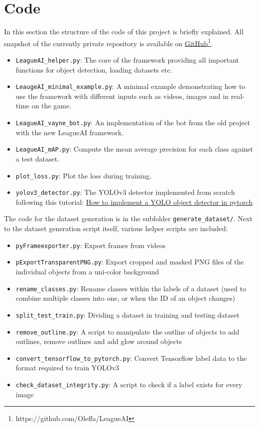 \section{Code}
In this section the structure of the code of this project is briefly explained.
All snapshot of the currently private repository is available on \href{https://github.com/Oleffa/LeagueAI}{GitHub}\footnote{https://github.com/Oleffa/LeagueAI}.
\begin{itemize}
\item \texttt{LeagueAI\_helper.py}: The core of the framework providing all important functions for object detection, loading datasets etc.
\item \texttt{LeaugeAI\_minimal\_example.py}: A minimal example demonstrating how to use the framework with different inputs such as videos, images and in real-time on the game.
\item \texttt{LeagueAI\_vayne\_bot.py}: An implementation of the bot from the old project with the new LeagueAI framework.
\item \texttt{LeagueAI\_mAP.py}: Compute the mean average precision for each class against a test dataset.
\item \texttt{plot\_loss.py}: Plot the loss during training.
\item \texttt{yolov3\_detector.py}: The YOLOv3 detector implemented from scratch following this tutorial: \href{https://blog.paperspace.com/how-to-implement-a-yolo-object-detector-in-pytorch}{How to implement a YOLO object detector in pytorch}
\end{itemize}
The code for the dataset generation is in the subfolder \texttt{generate\_dataset/}.
Next to the dataset generation script itself, various helper scripts are included:
\begin{itemize}
\item \texttt{pyFrameexporter.py}: Export frames from videos
\item \texttt{pExportTransparentPNG.py}: Export cropped and masked PNG files of the individual objects from a uni-color background
\item \texttt{rename\_classes.py}: Rename classes within the labels of a dataset (used to combine multiple classes into one, or when the ID of an object changes)
\item \texttt{split\_test\_train.py}: Dividing a dataset in training and testing dataset
\item \texttt{remove\_outline.py}: A script to manipulate the outline of objects to add outlines, remove outlines and add glow around objects
\item \texttt{convert\_tensorflow\_to\_pytorch.py}: Convert Tensorflow label data to the format required to train YOLOv3
\item \texttt{check\_dataset\_integrity.py}: A script to check if a label exists for every image
\end{itemize}
